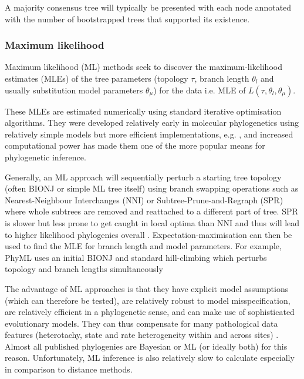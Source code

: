 A majority consensus tree will typically be presented with each node
annotated with the number of bootstrapped trees that supported its existence.

\subsubsection{Maximum likelihood}

Maximum likelihood (ML) methods seek to discover the maximum-likelihood estimates (MLEs) of the tree parameters 
(topology \(\tau\), branch length \(\theta_l\) and usually substitution model parameters \(\theta_\mu\))
for the data i.e. MLE of \(L(\tau, \theta_l, \theta_\mu)\). 

These MLEs are estimated numerically using standard iterative optimisation algorithms.
They were developed relatively early in molecular phylogenetics using relatively
simple models \citep{neyman1971molecular} but more efficient implementations, e.g. \citep{Felsenstein1981},
and increased computational power has made them one of the more popular means
for phylogenetic inference.

Generally, an ML approach will sequentially perturb a starting tree topology (often BIONJ or simple ML tree itself) 
using branch swapping operations such as Nearest-Neighbour Interchanges (NNI)
or Subtree-Prune-and-Regraph (SPR) where whole subtrees are removed and reattached to a different part of tree. 
SPR is slower but less prone to get caught in local optima than NNI and thus will
lead to higher likelihood phylogenies overall \citep{Criscuolo2011}.
Expectation-maximisation can then be used to find the MLE for branch length and model parameters.
For example, PhyML uses an initial BIONJ and standard hill-climbing which perturbs topology and branch lengths simultaneously 


The advantage of ML approaches is that they have explicit model assumptions (which can therefore be tested), are relatively robust to model
misspecification, are relatively efficient in a phylogenetic sense, and can make use of sophisticated evolutionary models.
They can thus compensate
for many pathological data features (heterotachy, state and rate heterogeneity within and across sites)
\citep{Yang2012}. Almost all published phylogenies are Bayesian or ML (or ideally both) for this reason.
Unfortunately, ML inference is also relatively slow to calculate especially in comparison to distance methods.


